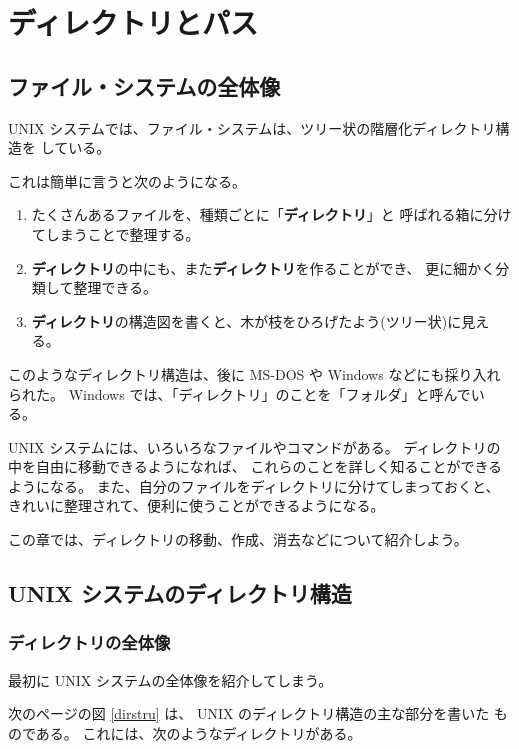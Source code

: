 \chapter{ディレクトリとパス}

\section*{ファイル・システムの全体像}

 UNIX システムでは、ファイル・システムは、ツリー状の階層化ディレクトリ構造を
している。

これは簡単に言うと次のようになる。
\begin{enumerate}
\item たくさんあるファイルを、種類ごとに「\textbf{ディレクトリ}」と
呼ばれる箱に分けてしまうことで整理する。
\item \textbf{ディレクトリ}の中にも、また\textbf{ディレクトリ}を作ることができ、
更に細かく分類して整理できる。
\item \textbf{ディレクトリ}の構造図を書くと、木が枝をひろげたよう(ツリー状)に見える。
\end{enumerate}

このようなディレクトリ構造は、後に MS-DOS や Windows などにも採り入れられた。
 Windows では、「ディレクトリ」のことを「フォルダ」と呼んでいる。

\bigskip

 UNIX システムには、いろいろなファイルやコマンドがある。
ディレクトリの中を自由に移動できるようになれば、
これらのことを詳しく知ることができるようになる。
また、自分のファイルをディレクトリに分けてしまっておくと、
きれいに整理されて、便利に使うことができるようになる。

この章では、ディレクトリの移動、作成、消去などについて紹介しよう。

\section{UNIX システムのディレクトリ構造}

\subsection{ディレクトリの全体像}

最初に UNIX システムの全体像を紹介してしまう。

次のページの図 \ref{dirstru} は、 UNIX のディレクトリ構造の主な部分を書いた
ものである。
これには、次のようなディレクトリがある。

